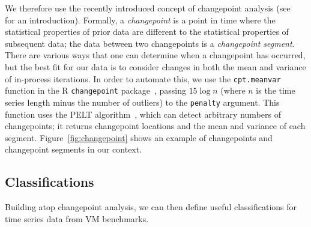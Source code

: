 \documentclass[acmlarge]{acmart}\settopmatter{printfolios=true}
\begin{document}
We therefore use the recently introduced concept of changepoint analysis
(see~\cite{eckley11analysis} for an introduction). Formally, a
\emph{changepoint} is a point in time where the statistical properties of prior
data are different to the statistical properties of subsequent data; the data
between two changepoints is a \emph{changepoint segment}. There are various
ways that one can determine when a changepoint has occurred, but the best fit
for our data is to consider changes in both the mean and variance of in-process
iterations. In order to automate this, we use the \texttt{cpt.meanvar} function in the R
\texttt{changepoint} package~\cite{killick14changepoint}, passing $15\log{n}$ (where
$n$ is the time series length minus the number of outliers) to the
\texttt{penalty} argument. This function uses the PELT
algorithm~\citep{killick12optimal}, which can detect arbitrary numbers of changepoints; it
returns changepoint locations and the mean and variance
of each segment. Figure~\ref{fig:changepoint} shows an example of changepoints and
changepoint segments in our context.


\subsection{Classifications}
\label{sec:classifications}

Building atop changepoint analysis, we can then define useful classifications
for time series data from VM benchmarks.
\end{document}
